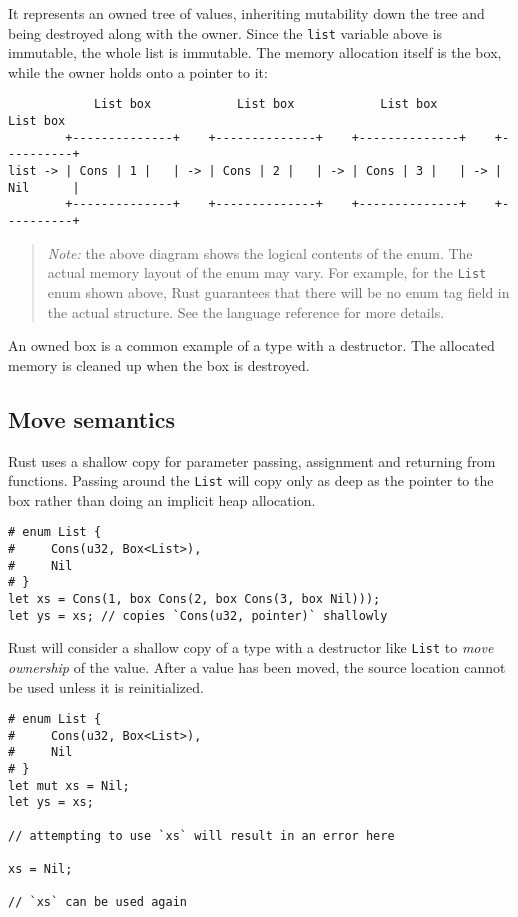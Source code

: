 \documentclass[]{article}
\begin{document}
It represents an owned tree of values, inheriting mutability down the
tree and being destroyed along with the owner. Since the \texttt{list}
variable above is immutable, the whole list is immutable. The memory
allocation itself is the box, while the owner holds onto a pointer to
it:

\begin{verbatim}
            List box            List box            List box          List box
        +--------------+    +--------------+    +--------------+    +----------+
list -> | Cons | 1 |   | -> | Cons | 2 |   | -> | Cons | 3 |   | -> | Nil      |
        +--------------+    +--------------+    +--------------+    +----------+
\end{verbatim}

\begin{quote}
\emph{Note:} the above diagram shows the logical contents of the enum.
The actual memory layout of the enum may vary. For example, for the
\texttt{List} enum shown above, Rust guarantees that there will be no
enum tag field in the actual structure. See the language reference for
more details.
\end{quote}

An owned box is a common example of a type with a destructor. The
allocated memory is cleaned up when the box is destroyed.

\subsection{Move semantics}\label{move-semantics}

Rust uses a shallow copy for parameter passing, assignment and returning
from functions. Passing around the \texttt{List} will copy only as deep
as the pointer to the box rather than doing an implicit heap allocation.

\begin{verbatim}
# enum List {
#     Cons(u32, Box<List>),
#     Nil
# }
let xs = Cons(1, box Cons(2, box Cons(3, box Nil)));
let ys = xs; // copies `Cons(u32, pointer)` shallowly
\end{verbatim}

Rust will consider a shallow copy of a type with a destructor like
\texttt{List} to \emph{move ownership} of the value. After a value has
been moved, the source location cannot be used unless it is
reinitialized.

\begin{verbatim}
# enum List {
#     Cons(u32, Box<List>),
#     Nil
# }
let mut xs = Nil;
let ys = xs;

// attempting to use `xs` will result in an error here

xs = Nil;

// `xs` can be used again
\end{verbatim}
\end{document}
